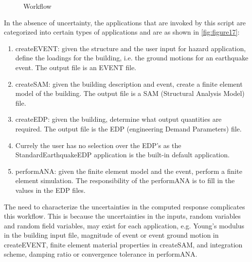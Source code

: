 \begin{figure}[!htbp]
  \caption{Workflow}
  \label{fig:figure17}
\end{figure}


In the absence of uncertainty, the applications that are invoked by this script are categorized into certain types of applications and are as shown in \autoref{fig:figure17}:
\begin{enumerate}
\item	 createEVENT: given the structure and the user input for hazard application, define the loadings for the building, i.e. the ground motions for an earthquake event. The output file is an EVENT file.
\item	 createSAM: given the building description and event, create a finite element model of the building. The output file is a SAM (Structural Analysis Model) file.
\item	 createEDP: given the building, determine what output quantities are required. The output file is the EDP (engineering Demand Parameters) file.
\item	 Currely the user has no selection over the EDP’s as the StandardEarthquakeEDP application is the built-in default application.
\item	 performANA: given the finite element model and the event, perform a finite element simulation. The responsibility of the performANA is to fill in the values in the EDP files.
\end{enumerate}


The need to characterize the uncertainties in the computed response complicates this workflow. This is because the uncertainties in the inputs, 
random variables and random field variables, may exist for each application, e.g. Young’s modulus in the building input file, magnitude of event or 
event ground motion in createEVENT, finite element material properties in createSAM, and integration scheme, damping ratio or convergence tolerance in performANA. 

